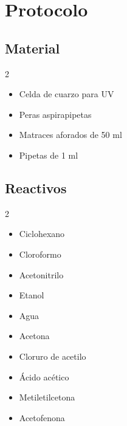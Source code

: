 \documentclass{tufte-handout}
\begin{document}
\section{Protocolo}
\subsection{Material}
    \begin{multicols}{2}
\begin{itemize}
\item Celda de cuarzo para UV
\item Peras aspirapipetas
\item Matraces aforados de 50 ml
\item Pipetas de 1 ml
\end{itemize}
    \end{multicols}

\subsection{Reactivos}
    \begin{multicols}{2}
\begin{itemize}
\item Ciclohexano
\item Cloroformo
\item Acetonitrilo
\item Etanol
\item Agua
\item Acetona
\item Cloruro de acetilo
\item Ácido acético
\item Metiletilcetona
\item Acetofenona
\end{itemize}
    \end{multicols}
\end{document}
